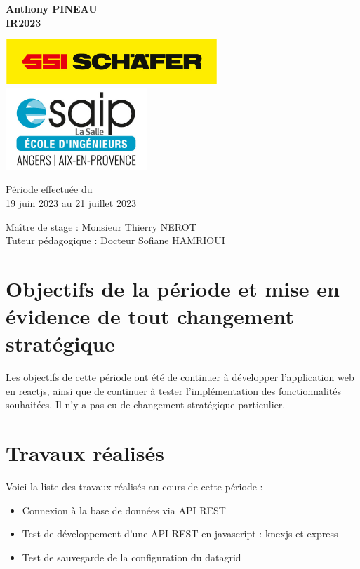 \documentclass[a4paper, 12pt, french]{article}
\newcommand{\bdot}{\item[\color{ssiYellow}\ding{108}]}
\begin{document}
\begin{titlepage}
\begin{center}
			\textbf{Anthony PINEAU}\\
			\textbf{IR2023}

			\vfill

			\includegraphics[width=0.6\textwidth]{../images/schaefer.jpg}
			\vfill
			\includegraphics[width=0.4\textwidth]{../images/esaip.jpg}

			\vfill

			Période effectuée du\\
			19 juin 2023 au 21 juillet 2023

			\vspace{0.8cm}
			
			\Large
			Maître de stage : Monsieur Thierry NEROT\\
			Tuteur pédagogique : Docteur Sofiane HAMRIOUI\\
		\end{center}
	\end{titlepage}
		
	\newpage
	
	\doublespacing
	\tableofcontents
	
	\listoffigures
	
	\newpage
		
	
	\singlespacing

	\section{Objectifs de la période et mise en évidence de tout changement stratégique}
		Les objectifs de cette période ont été de continuer à développer l'application web en reactjs, ainsi que de continuer à tester l'implémentation des fonctionnalités souhaitées. Il n'y a pas eu de changement stratégique particulier.

	\section{Travaux réalisés}
		Voici la liste des travaux réalisés au cours de cette période :
		\begin{itemize}
			\bdot{Connexion à la base de données via API REST}
			\bdot{Test de développement d'une API REST en javascript : knexjs et express}
			\bdot{Test de sauvegarde de la configuration du datagrid}
		\end{itemize}		
\end{document}
